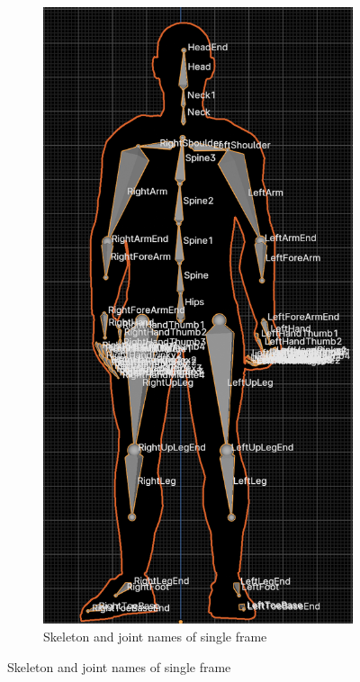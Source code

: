 \begin{figure}[h]
	\centering
	\begin{subfigure}{0.2\linewidth}
		\centering
		\includegraphics[width=\linewidth]{figures/Skeleton.png}
		\caption{\small Skeleton and joint names of single frame}

\end{subfigure}
\end{figure}
